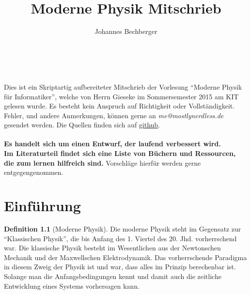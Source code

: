 \documentclass[oneside]{book}
\theoremstyle{definition}
\newtheorem*{definition*}{Definition}
\begin{document}
\title{Moderne Physik Mitschrieb}

\author{Johannes Bechberger}

\maketitle

\tableofcontents
~\\~\\
	Dies ist ein Skriptartig aufbereiteter Mitschrieb der Vorlesung "`Moderne Physik für Informatiker"', welche von Herrn Gieseke im Sommersemester 2015 am KIT gelesen wurde. Es besteht kein Anspruch auf Richtigkeit oder Vollständigkeit. Fehler, und andere Anmerkungen, können gerne an \textit{me@mostlynerdless.de} gesendet werden. Die Quellen finden sich auf \href{https://github.com/parttimenerd/Moderne-Physik}{github}.\\
	~\\
	\textbf{Es handelt sich um einen Entwurf, der laufend verbessert wird.} ~\\
	\textbf{Im Literaturteil findet sich eine Liste von Büchern und Ressourcen, die zum lernen hilfreich sind.} Vorschläge hierfür werden gerne entgegengenommen.
\listoftodos

\chapter{Einführung}

\begin{definition*}[Moderne Physik]
	Die moderne Physik steht im Gegensatz zur "`Klassischen Physik"', die bis Anfang des 1. Viertel des 20. Jhd. vorherrschend war. Die klassische Physik besteht im Wesentlichen aus der Newtonschen Mechanik und der Maxwellschen Elektrodynamik.
	Das vorherrschende Paradigma in diesem Zweig der Physik ist und war, dass alles im Prinzip berechenbar ist. Solange man die Anfangsbedingungen kennt und damit auch die zeitliche Entwicklung eines Systems vorhersagen kann.
\end{definition*}
\end{document}
